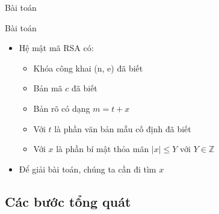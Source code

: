 \begin{frame}{Bài toán}

\begin{block}{Bài toán}
\begin{itemize}
\item Hệ mật mã RSA có:

\begin{itemize}
\item Khóa công khai (n, e) đã biết
\item Bản mã $c$ đã biết
\item Bản rõ có dạng $m = t + x$
\item Với $t$ là phần văn bản mẫu cố định đã biết
\item Với $x$ là phần bí mật thỏa mãn $|x| \leq Y$ với \(Y \in \mathbb{Z} \)
\end{itemize}
\item Để giải bài toán, chúng ta cần đi tìm $x$
\end{itemize}

\end{block}

\end{frame}
\subsection{Các bước tổng quát}


